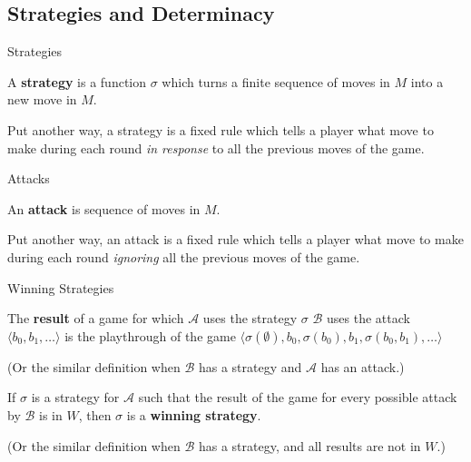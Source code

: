 \documentclass{beamer}
\theoremstyle{theorem}
\theoremstyle{definition}
\newcommand{\<}{\langle}
\renewcommand{\>}{\rangle}
\newcommand{\pl}[1]{\mathscr{#1}}
\newcommand{\term}[1]{\textbf{#1}}
\begin{document}
\subsection{Strategies and Determinacy}

\begin{frame}{Strategies}
  \begin{definition}
    A \term{strategy} is a function $\sigma$ which turns a finite sequence
    of moves in $M$ into a new move in $M$.
  \end{definition}

  \pause

  Put another way, a strategy is a fixed rule which tells a player what move
  to make during each round \textit{in response} to all the previous moves
  of the game.
\end{frame}

\begin{frame}{Attacks}
  \begin{definition}
    An \term{attack} is sequence of moves in $M$.
  \end{definition}

  \pause

  Put another way, an attack is a fixed rule which tells a player what move
  to make during each round \textit{ignoring} all the previous moves of
  the game.
\end{frame}

\begin{frame}{Winning Strategies}
  \begin{definition}
    The \term{result} of a game for which $\pl A$ uses the strategy $\sigma$
    $\pl B$ uses the attack $\<b_0,b_1,\dots\>$ is the playthrough of the
    game $\<\sigma(\emptyset),b_0,\sigma(b_0),b_1,\sigma(b_0,b_1),\dots\>$
  \end{definition}

  (Or the similar definition when $\pl B$ has a strategy and $\pl A$
  has an attack.)

  \pause

  \begin{definition}
    If $\sigma$ is a strategy for $\pl A$ such that the result of the game for
    every possible attack by $\pl B$ is in $W$, then $\sigma$ is a
    \term{winning strategy}.
  \end{definition}

  (Or the similar definition when $\pl B$ has a strategy, and all results
  are not in $W$.)
\end{frame}
\end{document}
